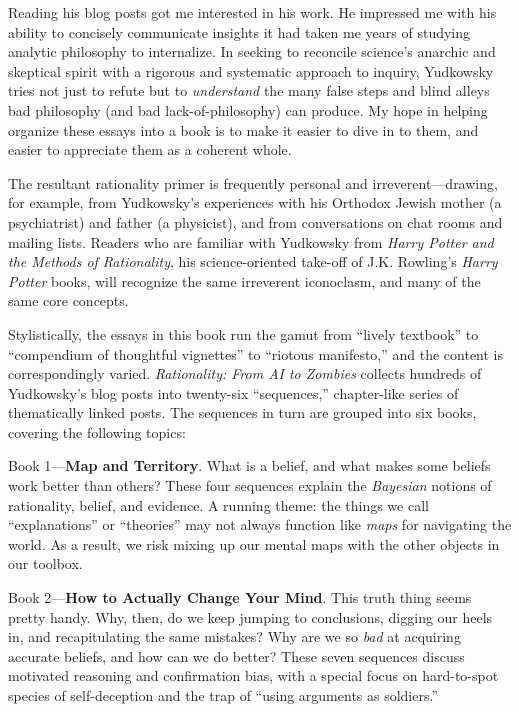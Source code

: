 \documentclass[letterpaper]{book}
\begin{document}
{
 Reading his blog posts got me interested in his work. He impressed
me with his ability to concisely communicate insights it had taken me
years of studying analytic philosophy to internalize. In seeking to
reconcile science's anarchic and skeptical spirit with
a rigorous and systematic approach to inquiry, Yudkowsky tries not just
to refute but to \textit{understand} the many false steps and blind
alleys bad philosophy (and bad lack-of-philosophy) can produce. My hope
in helping organize these essays into a book is to make it easier to
dive in to them, and easier to appreciate them as a coherent whole.}

{
 The resultant rationality primer is frequently personal and
irreverent---drawing, for example, from Yudkowsky's
experiences with his Orthodox Jewish mother (a psychiatrist) and father
(a physicist), and from conversations on chat rooms and mailing lists.
Readers who are familiar with Yudkowsky from \textit{Harry Potter and
the Methods of Rationality}, his science-oriented take-off of J.K.
Rowling's \textit{Harry Potter} books, will recognize
the same irreverent iconoclasm, and many of the same core concepts.}

{
 Stylistically, the essays in this book run the gamut from
``lively textbook'' to
``compendium of thoughtful
vignettes'' to ``riotous
manifesto,'' and the content is correspondingly
varied. \textit{Rationality: From AI to Zombies} collects hundreds of
Yudkowsky's blog posts into twenty-six
``sequences,'' chapter-like series
of thematically linked posts. The sequences in turn are grouped into
six books, covering the following topics:}

{
 Book 1---\textbf{Map and Territory}. What is a belief, and what
makes some beliefs work better than others? These four sequences
explain the \textit{Bayesian} notions of rationality, belief, and
evidence. A running theme: the things we call
``explanations'' or
``theories'' may not always function
like \textit{maps} for navigating the world. As a result, we risk
mixing up our mental maps with the other objects in our toolbox.}

{
 Book 2---\textbf{How to Actually Change Your Mind}. This truth
thing seems pretty handy. Why, then, do we keep jumping to conclusions,
digging our heels in, and recapitulating the same mistakes? Why are we
so \textit{bad} at acquiring accurate beliefs, and how can we do
better? These seven sequences discuss motivated reasoning and
confirmation bias, with a special focus on hard-to-spot species of
self-deception and the trap of ``using arguments as
soldiers.''}
\end{document}
